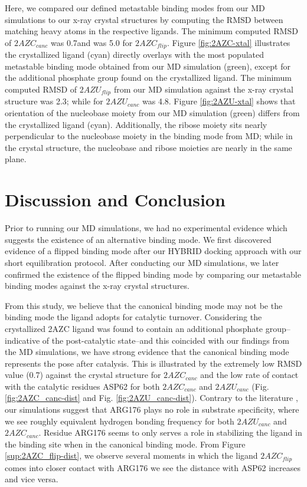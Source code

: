 Here, we compared our defined metastable binding modes from our MD simulations to our x-ray crystal structures by computing the RMSD between matching heavy atoms in the respective ligands.
The minimum computed RMSD of $2AZC_{canc}$ was 0.7\angstrom and was 5.0 for $2AZC_{flip}$.
Figure \ref{fig:2AZC-xtal} illustrates the crystallized ligand (cyan) directly overlays with the most populated metastable binding mode obtained from our MD simulation (green), except for the additional phosphate group found on the crystallized ligand.
The minimum computed RMSD of $2AZU_{flip}$ from our MD simulation against the x-ray crystal structure was 2.3\angstrom; while for $2AZU_{canc}$ was 4.8\angstrom.
Figure \ref{fig:2AZU-xtal} shows that orientation of the nucleobase moiety from our MD simulation (green) differs from the crystallized ligand (cyan).
Additionally, the ribose moiety sits nearly perpendicular to the nucleobase moiety in the binding mode from MD; while in the crystal structure, the nucleobase and ribose moieties are nearly in the same plane.

\section{Discussion and Conclusion}
Prior to running our MD simulations, we had no experimental evidence which suggests the existence of an alternative binding mode.
We first discovered evidence of a flipped binding mode after our HYBRID docking approach with our short equilibration protocol.
After conducting our MD simulations, we later confirmed the existence of the flipped binding mode by comparing our metastable binding modes against the x-ray crystal structures.

From this study, we believe that the canonical binding mode may not be the binding mode the ligand adopts for catalytic turnover.
Considering the crystallized 2AZC ligand was found to contain an additional phosphate group--indicative of the post-catalytic state--and this coincided with our findings from the MD simulations, we have strong evidence that the canonical binding mode represents the pose after catalysis.
This is illustrated by the extremely low RMSD value (0.7\angstrom) against the crystal structure for $2AZC_{canc}$ and the low rate of contact with the catalytic residues ASP62 for both $2AZC_{canc}$ and $2AZU_{canc}$ (Fig. \ref{fig:2AZC_canc-dist} and Fig. \ref{fig:2AZU_canc-dist}).
Contrary to the literature \cite{tanaka2016molecular}, our simulations suggest that ARG176 plays no role in substrate specificity, where we see roughly equivalent hydrogen bonding frequency for both $2AZU_{canc}$ and $2AZC_{canc}$.
Residue ARG176 seems to only serves a role in stabilizing the ligand in the binding site when in the canonical binding mode.
From Figure \ref{sup:2AZC_flip-dist}, we observe several moments in which the ligand $2AZC_{flip}$ comes into closer contact with ARG176 we see the distance with ASP62 increases and vice versa.

